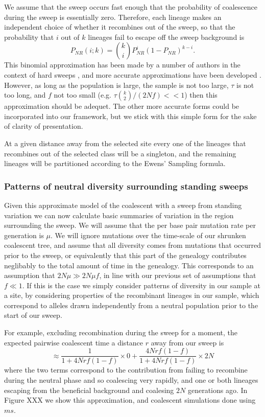 \documentclass[a4paper,10pt]{article}
\begin{document}
We assume that the sweep occurs fast enough that the probability of coalescence during the sweep is essentially zero. Therefore, each lineage makes an independent choice of whether it recombines out of the sweep, so that the probability that $i$ out of $k$ lineages fail to escape off the sweep background is
\begin{equation}
P_{NR}(i;k) = {k \choose i} P_{NR}^{i} (1-P_{NR})^{k-i}.
\end{equation}
This binomial approximation has been made by a number of authors in the context of hard sweeps \citep{Barton}, and more accurate approximations have been developed \citep{}. However, as long as the population is large, the sample is not too large,  $\tau$ is not too long, and $f$ not too small (e.g. $\tau {k \choose 2}/(2Nf)<<1$) then this approximation should be adequet. The other more accurate forms could be incorporated into our framework, but we stick with this simple form for the sake of clarity of presentation.

At a given distance away from the selected site every one of the lineages that recombines out of the selected class will be a singleton, and the remaining lineages will be partitioned according to the Ewens' Sampling formula.  

\subsubsection{Patterns of neutral diversity surrounding standing sweeps}
Given this approximate model of the coalescent with a sweep from standing variation we can now calculate basic summaries of variation in the region surrounding the sweep. We will assume that the per base pair mutation rate per generation is $\mu$. We will ignore mutations over the time-scale of our shrunken coalescent tree, and assume that all diversity comes from mutations that occurred prior to the sweep, or equivalently that this part of the genealogy contributes neglibably to the total amount of time in the genealogy. This corresponds to an assumption that $2N\mu \gg 2N \mu f$, in line with our previous set of assumptions that $f \ll 1$. If this is the case we simply consider patterns of diversity in our sample at a site, by considering properties of the recombinant lineages in our sample, which correspond to alleles drawn independently from a neutral population prior to the start of our sweep.

For example, excluding recombination during the sweep for a moment, the expected pairwise coalescent time a distance $r$ away from our sweep is
\begin{equation}
\approx \frac{1}{1 + 4Nrf(1-f)} \times 0 + \frac{4Nrf(1-f)}{1 + 4Nrf(1-f)} \times 2N
\end{equation}
where the two terms correspond to the contribution from failing to recombine during the neutral phase and so coalescing very rapidly, and one or both lineages escaping from the beneficial background and coalesing $2N$ generations ago. In Figure XXX we show this approximation, and coalescent simulations done using $ms$. 
\end{document}
